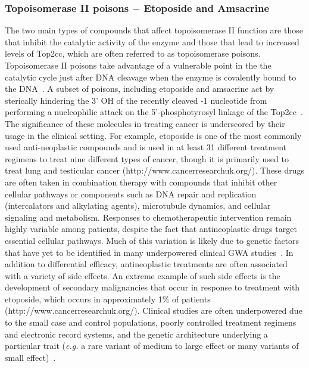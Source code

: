 \documentclass[12pt]{article}
\begin{document}
\subsubsection{Topoisomerase II poisons $-$ Etoposide and Amsacrine}\label{top2inh}

The two main types of compounds that affect topoisomerase II function are those that inhibit the catalytic activity of the enzyme and those that lead to increased levels of Top2cc, which are often referred to as topoisomerase poisons. Topoisomerase II poisons take advantage of a vulnerable point in the the catalytic cycle just after DNA cleavage when the enzyme is covalently bound to the DNA~\cite{Nitiss:2009kg}. A subset of poisons, including etoposide and amsacrine act by sterically hindering the 3' OH of the recently cleaved -1 nucleotide from performing a nucleophilic attack on the 5'-phosphotyrosyl linkage of the Top2cc~\cite{Wu:2013dia}. The significance of these molecules in treating cancer is underscored by their usage in the clinical setting. For example, etoposide is one of the most commonly used anti-neoplastic compounds and is used in at least 31 different treatment regimens to treat nine different types of cancer, though it is primarily used to treat lung and testicular cancer (http://www.cancerresearchuk.org/). These drugs are often taken in combination therapy with compounds that inhibit other cellular pathways or components such as DNA repair and replication (intercalators and alkylating agents), microtubule dynamics, and cellular signaling and metabolism. Responses to chemotherapeutic intervention remain highly variable among patients, despite the fact that antineoplastic drugs target essential cellular pathways. Much of this variation is likely due to genetic factors that have yet to be identified in many underpowered clinical GWA studies~\cite{Low:2013jw,Huang:2007id}. In addition to differential efficacy, antineoplastic treatments are often associated with a variety of side effects. An extreme example of such side effects is the development of secondary malignancies that occur in response to treatment with etoposide, which occurs in approximately 1\% of patients (http://www.cancerresearchuk.org/). Clinical studies are often underpowered due to the small case and control populations, poorly controlled treatment regimens and electronic record systems, and the genetic architecture underlying a particular trait ({\it e.g.} a rare variant of medium to large effect or many variants of small effect)~\cite{Koboldt:2013kw,Park:2012bz}. 
\vspace{-10pt}
\end{document}
